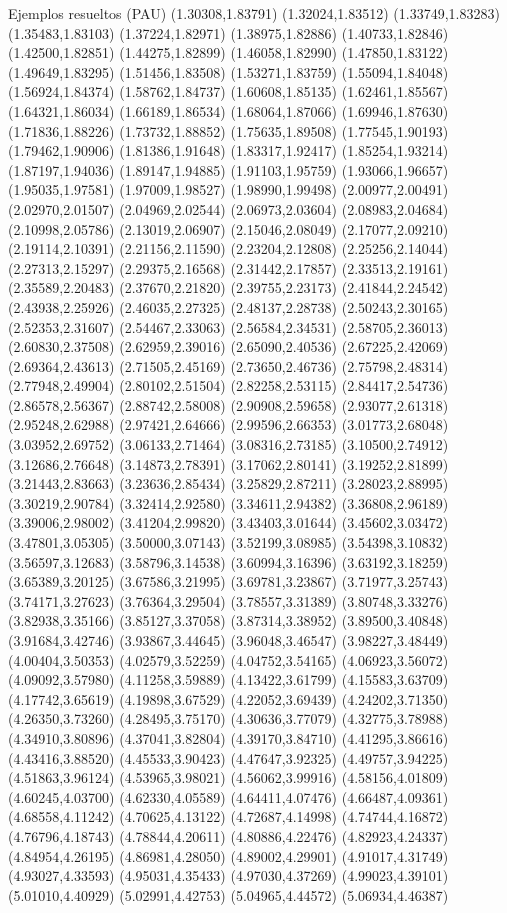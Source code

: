 \documentclass[11pt,a4paper]{article}
\begin{document}
\begin{fmex}{Ejemplos resueltos (PAU)}
(1.30308,1.83791) (1.32024,1.83512) (1.33749,1.83283) (1.35483,1.83103) (1.37224,1.82971) (1.38975,1.82886) (1.40733,1.82846) (1.42500,1.82851) (1.44275,1.82899) (1.46058,1.82990) (1.47850,1.83122) (1.49649,1.83295) (1.51456,1.83508) (1.53271,1.83759) (1.55094,1.84048) (1.56924,1.84374) (1.58762,1.84737) (1.60608,1.85135) (1.62461,1.85567) (1.64321,1.86034) (1.66189,1.86534) (1.68064,1.87066) (1.69946,1.87630) (1.71836,1.88226) (1.73732,1.88852) (1.75635,1.89508) (1.77545,1.90193) (1.79462,1.90906) (1.81386,1.91648) (1.83317,1.92417) (1.85254,1.93214) (1.87197,1.94036) (1.89147,1.94885) (1.91103,1.95759) (1.93066,1.96657) (1.95035,1.97581) (1.97009,1.98527) (1.98990,1.99498) (2.00977,2.00491) (2.02970,2.01507) (2.04969,2.02544) (2.06973,2.03604) (2.08983,2.04684) (2.10998,2.05786) (2.13019,2.06907) (2.15046,2.08049) (2.17077,2.09210) (2.19114,2.10391) (2.21156,2.11590) (2.23204,2.12808) (2.25256,2.14044) (2.27313,2.15297) (2.29375,2.16568) (2.31442,2.17857) (2.33513,2.19161) (2.35589,2.20483) (2.37670,2.21820) (2.39755,2.23173) (2.41844,2.24542) (2.43938,2.25926) (2.46035,2.27325) (2.48137,2.28738) (2.50243,2.30165) (2.52353,2.31607) (2.54467,2.33063) (2.56584,2.34531) (2.58705,2.36013) (2.60830,2.37508) (2.62959,2.39016) (2.65090,2.40536) (2.67225,2.42069) (2.69364,2.43613) (2.71505,2.45169) (2.73650,2.46736) (2.75798,2.48314) (2.77948,2.49904) (2.80102,2.51504) (2.82258,2.53115) (2.84417,2.54736) (2.86578,2.56367) (2.88742,2.58008) (2.90908,2.59658) (2.93077,2.61318) (2.95248,2.62988) (2.97421,2.64666) (2.99596,2.66353) (3.01773,2.68048) (3.03952,2.69752) (3.06133,2.71464) (3.08316,2.73185) (3.10500,2.74912) (3.12686,2.76648) (3.14873,2.78391) (3.17062,2.80141) (3.19252,2.81899) (3.21443,2.83663) (3.23636,2.85434) (3.25829,2.87211) (3.28023,2.88995) (3.30219,2.90784) (3.32414,2.92580) (3.34611,2.94382) (3.36808,2.96189) (3.39006,2.98002) (3.41204,2.99820) (3.43403,3.01644) (3.45602,3.03472) (3.47801,3.05305) (3.50000,3.07143) (3.52199,3.08985) (3.54398,3.10832) (3.56597,3.12683) (3.58796,3.14538) (3.60994,3.16396) (3.63192,3.18259) (3.65389,3.20125) (3.67586,3.21995) (3.69781,3.23867) (3.71977,3.25743) (3.74171,3.27623) (3.76364,3.29504) (3.78557,3.31389) (3.80748,3.33276) (3.82938,3.35166) (3.85127,3.37058) (3.87314,3.38952) (3.89500,3.40848) (3.91684,3.42746) (3.93867,3.44645) (3.96048,3.46547) (3.98227,3.48449) (4.00404,3.50353) (4.02579,3.52259) (4.04752,3.54165) (4.06923,3.56072) (4.09092,3.57980) (4.11258,3.59889) (4.13422,3.61799) (4.15583,3.63709) (4.17742,3.65619) (4.19898,3.67529) (4.22052,3.69439) (4.24202,3.71350) (4.26350,3.73260) (4.28495,3.75170) (4.30636,3.77079) (4.32775,3.78988) (4.34910,3.80896) (4.37041,3.82804) (4.39170,3.84710) (4.41295,3.86616) (4.43416,3.88520) (4.45533,3.90423) (4.47647,3.92325) (4.49757,3.94225) (4.51863,3.96124) (4.53965,3.98021) (4.56062,3.99916) (4.58156,4.01809) (4.60245,4.03700) (4.62330,4.05589) (4.64411,4.07476) (4.66487,4.09361) (4.68558,4.11242) (4.70625,4.13122) (4.72687,4.14998) (4.74744,4.16872) (4.76796,4.18743) (4.78844,4.20611) (4.80886,4.22476) (4.82923,4.24337) (4.84954,4.26195) (4.86981,4.28050) (4.89002,4.29901) (4.91017,4.31749) (4.93027,4.33593) (4.95031,4.35433) (4.97030,4.37269) (4.99023,4.39101) (5.01010,4.40929) (5.02991,4.42753) (5.04965,4.44572) (5.06934,4.46387) 
\end{fmex}
\end{document}
